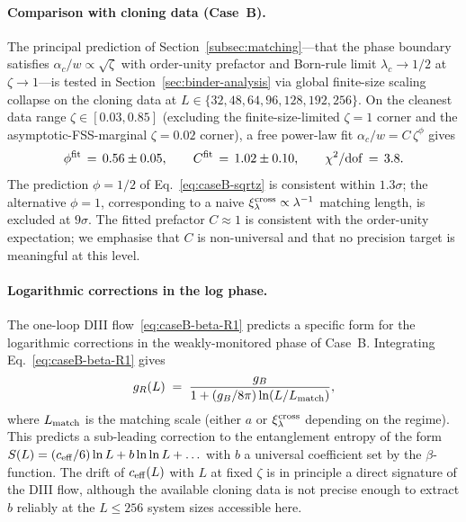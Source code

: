 \paragraph{Comparison with cloning data (Case~B).}
The principal prediction of Section~\ref{subsec:matching}---that the
phase boundary satisfies $\alpha_c/w\propto\sqrt{\zeta}$ with
order-unity prefactor and Born-rule limit $\lambda_c\to 1/2$ at
$\zeta\to 1$---is tested in
Section~\ref{sec:binder-analysis} via global finite-size scaling
collapse on the cloning data at $L\in\{32,48,64,96,128,192,256\}$.
On the cleanest data range $\zeta\in[0.03,0.85]$ (excluding the
finite-size-limited $\zeta=1$ corner and the asymptotic-FSS-marginal
$\zeta=0.02$ corner), a free power-law fit
$\alpha_c/w=C\,\zeta^{\phi}$ gives
\begin{equation}\label{eq:phi-C-fit}
  \phi^{\rm fit}\,=\,0.56\pm 0.05,
  \qquad
  C^{\rm fit}\,=\,1.02\pm 0.10,
  \qquad
  \chi^{2}/\mathrm{dof}\,=\,3.8.
\end{equation}
The prediction $\phi=1/2$ of Eq.~\eqref{eq:caseB-sqrtz} is consistent
within $1.3\sigma$; the alternative $\phi=1$, corresponding to a naive
$\xi_\lambda^{\rm cross}\propto\lambda^{-1}$ matching length, is
excluded at $9\sigma$.  The fitted prefactor $C\approx 1$ is
consistent with the order-unity expectation; we emphasise that $C$ is
non-universal and that no precision target is meaningful at this
level.

\paragraph{Logarithmic corrections in the log phase.}
The one-loop DIII flow~\eqref{eq:caseB-beta-R1} predicts a specific
form for the logarithmic corrections in the weakly-monitored phase of
Case~B.  Integrating Eq.~\eqref{eq:caseB-beta-R1} gives
\begin{equation}\label{eq:running-coupling}
  g_R(L) \;=\; \frac{g_B}{1 + (g_B/8\pi)\ln(L/L_{\rm match})},
\end{equation}
where $L_{\rm match}$ is the matching scale (either $a$ or
$\xi_\lambda^{\rm cross}$ depending on the regime).  This predicts a
sub-leading correction to the entanglement entropy of the form
$S(L) = (c_{\rm eff}/6)\ln L + b\ln\ln L+\ldots$ with $b$ a universal
coefficient set by the $\beta$-function.  The drift of $c_{\rm eff}(L)$
with $L$ at fixed $\zeta$ is in principle a direct signature of the
DIII flow, although the available cloning data is not precise enough
to extract $b$ reliably at the $L\leq 256$ system sizes accessible
here.


